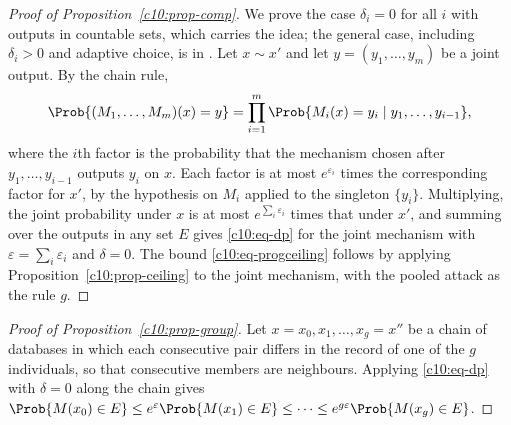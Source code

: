\begin{proof}[Proof of Proposition~\ref{c10:prop-comp}]
We prove the case $\delta_i = 0$ for all $i$ with outputs in countable sets, which
carries the idea; the general case, including $\delta_i > 0$ and adaptive choice,
is in \citet[ch.~3]{dwork2014}. Let $x \sim x'$ and let
$y = (y_1,\dots,y_m)$ be a joint output. By the chain rule,
\[
\Prob\{(M_1,\dots,M_m)(x) = y\}
= \prod_{i=1}^m \Prob\{M_i(x) = y_i \mid y_1,\dots,y_{i-1}\},
\]
where the $i$th factor is the probability that the mechanism chosen after
$y_1,\dots,y_{i-1}$ outputs $y_i$ on $x$. Each factor is at most $e^{\varepsilon_i}$
times the corresponding factor for $x'$, by the hypothesis on $M_i$ applied to the
singleton $\{y_i\}$. Multiplying, the joint probability under $x$ is at most
$e^{\sum_i \varepsilon_i}$ times that under $x'$, and summing over the outputs in
any set $E$ gives \eqref{c10:eq-dp} for the joint mechanism with
$\varepsilon = \sum_i\varepsilon_i$ and $\delta = 0$. The bound
\eqref{c10:eq-progceiling} follows by applying Proposition~\ref{c10:prop-ceiling}
to the joint mechanism, with the pooled attack as the rule $g$.
\end{proof}

\begin{proof}[Proof of Proposition~\ref{c10:prop-group}]
Let $x = x_0, x_1, \dots, x_g = x''$ be a chain of databases in which each
consecutive pair differs in the record of one of the $g$ individuals, so that
consecutive members are neighbours. Applying \eqref{c10:eq-dp} with $\delta = 0$
along the chain gives
$\Prob\{M(x_0) \in E\} \le e^{\varepsilon}\Prob\{M(x_1) \in E\} \le \dots
\le e^{g\varepsilon}\Prob\{M(x_g) \in E\}$.
\end{proof}
